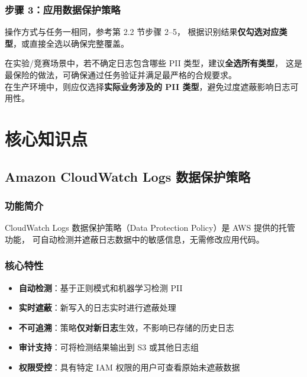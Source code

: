 \documentclass[12pt, a4paper]{article}
\begin{document}
\subsubsection{步骤 3：应用数据保护策略}

操作方式与任务一相同，参考第 2.2 节步骤 2--5，
根据识别结果\textbf{仅勾选对应类型}，或直接全选以确保完整覆盖。

\begin{tipbox}
  在实验/竞赛场景中，若不确定日志包含哪些 PII 类型，建议\textbf{全选所有类型}，
  这是最保险的做法，可确保通过任务验证并满足最严格的合规要求。\\[0.3em]
  在生产环境中，则应仅选择\textbf{实际业务涉及的 PII 类型}，避免过度遮蔽影响日志可用性。
\end{tipbox}

\newpage

\section{核心知识点}

\subsection{Amazon CloudWatch Logs 数据保护策略}

\subsubsection{功能简介}

CloudWatch Logs 数据保护策略（Data Protection Policy）是 AWS 提供的托管功能，
可自动检测并遮蔽日志数据中的敏感信息，无需修改应用代码。

\subsubsection{核心特性}

\begin{itemize}[leftmargin=2em]
  \item \textbf{自动检测}：基于正则模式和机器学习检测 PII
  \item \textbf{实时遮蔽}：新写入的日志实时进行遮蔽处理
  \item \textbf{不可追溯}：策略\textbf{仅对新日志}生效，不影响已存储的历史日志
  \item \textbf{审计支持}：可将检测结果输出到 S3 或其他日志组
  \item \textbf{权限受控}：具有特定 IAM 权限的用户可查看原始未遮蔽数据
\end{itemize}
\end{document}
